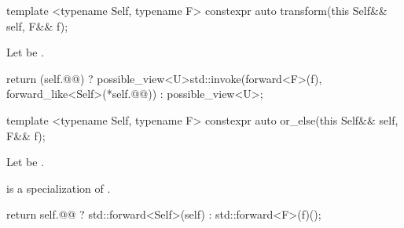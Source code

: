 \begin{itemdecl}
  template <typename Self, typename F>
  constexpr auto transform(this Self&& self, F&& f);
\end{itemdecl}

\begin{itemdescr}
  \pnum
  Let  be .

\pnum{}
\returns
\begin{codeblock}
  return (self.@@)
     ? possible_view<U>{std::invoke(forward<F>(f),
                                 forward_like<Self>(*self.@@))}
     : possible_view<U>{};

\end{codeblock}
\end{itemdescr}


\begin{itemdecl}
  template <typename Self, typename F>
  constexpr auto or_else(this Self&& self, F&& f);
\end{itemdecl}

\begin{itemdescr}
  Let  be .

  \pnum
  \mandates
   is a specialization of .

\pnum{}
\returns
\begin{codeblock}
  return self.@@ ? std::forward<Self>(self) : std::forward<F>(f)();
\end{codeblock}
\end{itemdescr}
